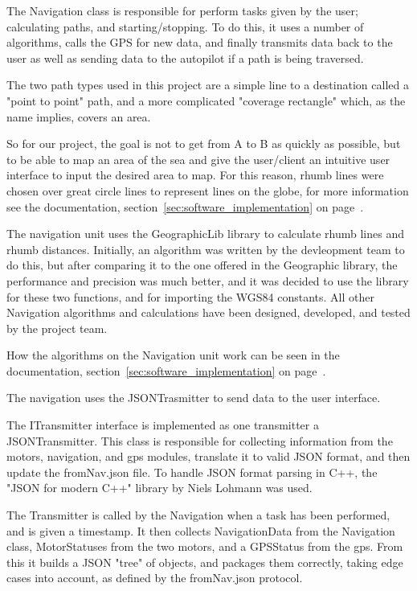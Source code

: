 The Navigation class is responsible for perform tasks given by the user; calculating paths, and starting/stopping. To do this, it uses a number of algorithms, calls the GPS for new data, and finally transmits data back to the user as well as sending data to the autopilot if a path is being traversed.

The two path types used in this project are a simple line to a destination called a "point to point" path, and a more complicated "coverage rectangle" which, as the name implies, covers an area.

So for our project, the goal is not to get from A to B as quickly as possible, but to be able to map an area of the sea and give the user/client an intuitive user interface to input the desired area to map. For this reason, rhumb lines were chosen over great circle lines to represent lines on the globe, for more information see the documentation, section~\ref{sec:software_implementation} on page~\pageref{sec:software_implementation}.

The navigation unit uses the GeographicLib library to calculate rhumb lines and rhumb distances. Initially, an algorithm was written by the devleopment team to do this, but after comparing it to the one offered in the Geographic library, the performance and precision was much better, and it was decided to use the library for these two functions, and for importing the WGS84 constants. All other Navigation algorithms and calculations have been designed, developed, and tested by the project team.

How the algorithms on the Navigation unit work can be seen in the documentation, section~\ref{sec:software_implementation} on page~\pageref{sec:software_implementation}.

The navigation uses the JSONTrasmitter to send data to the user interface.

The ITransmitter interface is implemented as one transmitter a JSONTransmitter. This class is responsible for collecting information from the motors, navigation, and gps modules, translate it to valid JSON format, and then update the fromNav.json file. To handle JSON format parsing in C++, the "JSON for modern C++" library by Niels Lohmann was used\cite{json}. 

The Transmitter is called by the Navigation when a task has been performed, and is given a timestamp. It then collects NavigationData from the Navigation class, MotorStatuses from the two motors, and a GPSStatus from the gps. From this it builds a JSON "tree" of objects, and packages them correctly, taking edge cases into account, as defined by the fromNav.json protocol. 

